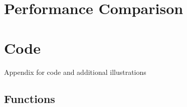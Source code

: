 \documentclass[aodsor,preprint]{imsart}
\numberwithin{equation}{section}
\theoremstyle{plain}
\begin{document}
\section{Performance Comparison}
\newpage

\appendix


\section{Code}
\label{sec:app}

Appendix for code and additional illustrations

\subsection{Functions}






\newpage
\printbibliography
\end{document}
